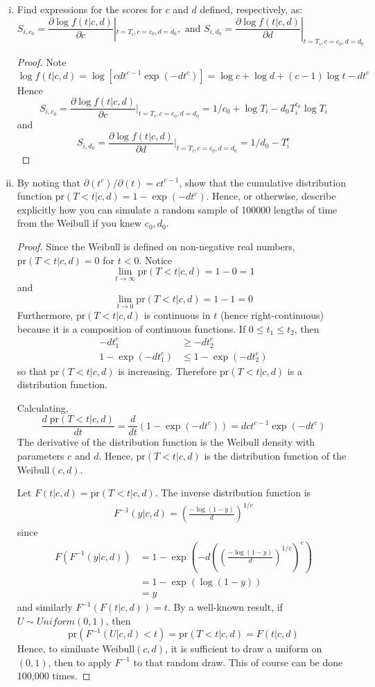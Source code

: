 \documentclass[letterpaper, 12pt]{article}\usepackage[]{graphicx}\usepackage[]{color}
\newcommand{\pr}{\text{pr}}
\begin{document}
\begin{enumerate}[(i)]
\item
Find expressions for the scores for $c$ and $d$ defined, respectively, as:
\[
S_{i, c_0} = 
\frac{\partial \log f(t|c,d)}{\partial c}
|
_{t=T_i, c=c_0, d=d_0},
\text{ and }
S_{i, d_0} =
\frac{\partial \log f(t|c,d)}{\partial d}
|
_{t=T_i, c=c_0, d=d_0}
\]

\begin{proof}
Note
\[
\log f(t|c,d) = \log [cdt^{c-1}\exp(-dt^c)]
= \log c + \log d + (c-1) \log t - dt^c
\]
Hence
\[
S_{i, c_0} = 
\frac{\partial \log f(t|c,d)}{\partial c}
|
_{t=T_i, c=c_0, d=d_0}
=
1/c_0 + \log T_i - d_0 T_i^{c_0} \log T_i
\]
and
\[
S_{i, d_0} = 
\frac{\partial \log f(t|c,d)}{\partial d}
|
_{t=T_i, c=c_0, d=d_0}
=
1/d_0 - T_i^c
\]
\end{proof}

\item
By noting that
$\partial(t^c) / \partial(t) = ct^{c-1}$, show that the cumulative distribution function $\pr(T<t | c,d) = 1 - \exp(-dt^c)$. Hence, or otherwise, describe explicitly how you can simulate a random sample of 100000 lengths of time from the Weibull if you knew $c_0, d_0$.
\begin{proof}
Since the Weibull is defined on non-negative real numbers, $\pr(T<t |c,d) = 0$ for $t < 0$.
Notice
\[
\lim_{t \to \infty}
\pr(T<t | c,d)
=
1 - 0 = 1
\]
and 
\[
\lim_{t \to 0}
\pr(T<t | c,d)
=
1- 1
=
0
\]
Furthermore, $\pr(T<t | c,d)$ is continuous in $t$ (hence right-continuous) because it is a composition of continuous functions. If $0 \leq t_1 \leq t_2$, then
\begin{align*}
-dt_1^c &\geq -dt_2^c \\
1-\exp(-dt_1^c) &\leq 1 -\exp(-dt_2^c)
\end{align*}
so that $\pr(T<t | c,d)$ is increasing. Therefore $\pr(T<t | c,d)$ is a distribution function.

Calculating,
\[
\frac{d \; \pr(T<t | c,d)}{dt}
=
\frac{d}{dt}
(1 - \exp(-dt^c))
=
dct^{c-1} \exp(-dt^c)
\]
The derivative of the distribution function is the Weibull density with parameters $c$ and $d$. Hence, $\pr(T<t | c,d)$ is the distribution function of the Weibull$(c,d)$. 

Let $F(t|c,d) = \pr(T<t | c,d)$. The inverse distribution function is 
\begin{align*}
F^{-1}(y|c,d) = \left(\frac{-\log (1-y)}{d} \right)^{1/c}
\end{align*}
since
\begin{align*}
F(F^{-1}(y|c,d)) 
&= 1 - \exp
\left(
-d 
\left(
\left(\frac{-\log (1-y)}{d} \right)^{1/c}
\right) ^c
\right)
\\
&=
1 - \exp(\log(1-y))
\\
&=
y
\end{align*}
and similarly $F^{-1}(F(t|c,d)) = t$. By a well-known result, if $U \sim Uniform(0,1)$, then 
\[
\pr(F^{-1}(U|c,d) < t) = \pr(T < t |c,d)  = F(t|c,d) 
\]
Hence, to similuate Weibull$(c,d)$, it is sufficient to draw a uniform on $(0,1)$, then to apply $F^{-1}$ to that random draw. This of course can be done 100,000 times.


\end{proof}
\end{enumerate}
\end{document}

